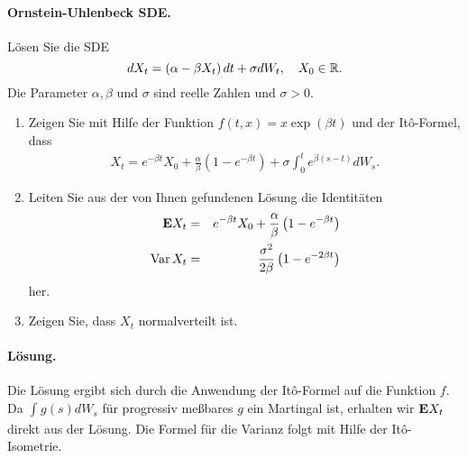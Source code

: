 \paragraph{Ornstein-Uhlenbeck SDE.} Lösen Sie die \textsc{SDE}
\begin{equation}
    dX_t = \left( \alpha-\beta X_t \right)dt + \sigma dW_t, \quad X_0\in\mathbb R.
\end{equation}
Die Parameter $\alpha, \beta$ und $\sigma$ sind reelle Zahlen und $\sigma>0$. 
\begin{enumerate}
    \item Zeigen Sie mit Hilfe der Funktion $f(t,x)=x\exp(\beta t)$ und der It\^o-Formel, dass
        \begin{eqnarray}
            X_t = e^{-\beta t} X_0 + \frac{\alpha}{\beta}\left( 1-e^{-\beta t} \right)
                       + \sigma \int_{0}^{t} e^{\beta(s-t)} d W_s.
        \end{eqnarray}
    \item Leiten Sie aus der von Ihnen gefundenen Lösung die Identitäten
        \begin{eqnarray}
            \mathbf{E} X_t &=& e^{-\beta t} X_0 + \frac{\alpha}{\beta}\left( 1-e^{-\beta t} \right) \\
            \operatorname{Var} X_t &=& \frac{\sigma^2}{2\beta}\left( 1- e^{-2\beta t} \right)
        \end{eqnarray} 
        her.
    \item Zeigen Sie, dass $X_t$ normalverteilt ist. 
\end{enumerate}

\ifdefined\showsolutions
\paragraph*{Lösung. } Die Lösung ergibt sich durch die Anwendung der It\^o-Formel
auf die Funktion $f$. Da $\int_{}^{} g(s) d W_s$ für progressiv meßbares $g$ ein
Martingal ist, erhalten wir $\mathbf{E} X_t$ direkt aus der Lösung. Die Formel für die 
Varianz folgt mit Hilfe der It\^o-Isometrie.
\fi



